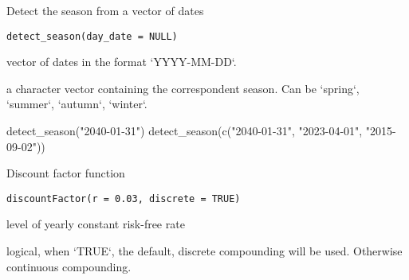 \documentclass[a4paper]{book}
\begin{document}
%
\begin{Description}\relax
Detect the season from a vector of dates
\end{Description}
%
\begin{Usage}
\begin{verbatim}
detect_season(day_date = NULL)
\end{verbatim}
\end{Usage}
%
\begin{Arguments}
\begin{ldescription}
\item[\code{day\_date}] vector of dates in the format `YYYY-MM-DD`.
\end{ldescription}
\end{Arguments}
%
\begin{Value}
a character vector containing the correspondent season. Can be `spring`, `summer`, `autumn`, `winter`.
\end{Value}
%
\begin{Examples}
\begin{ExampleCode}
detect_season("2040-01-31")
detect_season(c("2040-01-31", "2023-04-01", "2015-09-02"))

\end{ExampleCode}
\end{Examples}
%
\begin{Description}\relax
Discount factor function
\end{Description}
%
\begin{Usage}
\begin{verbatim}
discountFactor(r = 0.03, discrete = TRUE)
\end{verbatim}
\end{Usage}
%
\begin{Arguments}
\begin{ldescription}
\item[\code{r}] level of yearly constant risk-free rate

\item[\code{discrete}] logical, when `TRUE`, the default, discrete compounding will be used. Otherwise continuous compounding.
\end{ldescription}
\end{Arguments}
\end{document}
